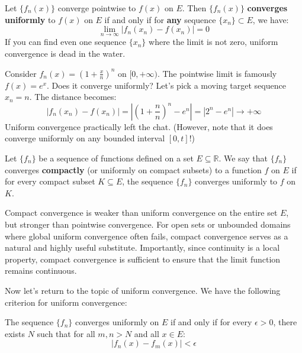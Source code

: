 \begin{theorem}
Let $\{f_n(x)\}$ converge pointwise to $f(x)$ on $E$. Then $\{f_n(x)\}$ \textbf{converges uniformly} to $f(x)$ on $E$ if and only if for \textbf{any} sequence $\{x_n\} \subset E$, we have:
\[ \lim_{n \to \infty} \left| f_n(x_n) - f(x_n) \right| = 0 \]
If you can find even one sequence $\{x_n\}$ where the limit is not zero, uniform convergence is dead in the water.
\end{theorem}

\begin{example}
Consider $f_n(x) = \left(1+\frac{x}{n}\right)^n$ on $[0,+\infty)$. The pointwise limit is famously $f(x) = e^x$. 
Does it converge uniformly? Let's pick a moving target sequence $x_n = n$. The distance becomes:
\[ |f_n(x_n) - f(x_n)| = \left| \left(1+\frac{n}{n}\right)^n - e^n \right| = |2^n - e^n| \to +\infty \]
Uniform convergence practically left the chat. (However, note that it does converge uniformly on any bounded interval $[0, t]$!)
\end{example}

\begin{definition}
    Let $\{f_n\}$ be a sequence of functions defined on a set $E \subseteq \mathbb{R}$. We say that $\{f_n\}$ converges \textbf{compactly} (or uniformly on compact subsets) to a function $f$ on $E$ if for every compact subset $K \subseteq E$, the sequence $\{f_n\}$ converges uniformly to $f$ on $K$.
\end{definition}

Compact convergence is weaker than uniform convergence on the entire set $E$, but stronger than pointwise convergence. For open sets or unbounded domains where global uniform convergence often fails, compact convergence serves as a natural and highly useful substitute. Importantly, since continuity is a local property, compact convergence is sufficient to ensure that the limit function remains continuous.

Now let's return to the topic of uniform convergence. We have the following criterion for uniform convergence:

\begin{theorem}
The sequence $\{f_n\}$ converges uniformly on $E$ if and only if for every $\epsilon > 0$, there exists $N$ such that for all $m, n > N$ and all $x \in E$:
\[ |f_n(x) - f_m(x)| < \epsilon \]
\end{theorem}

